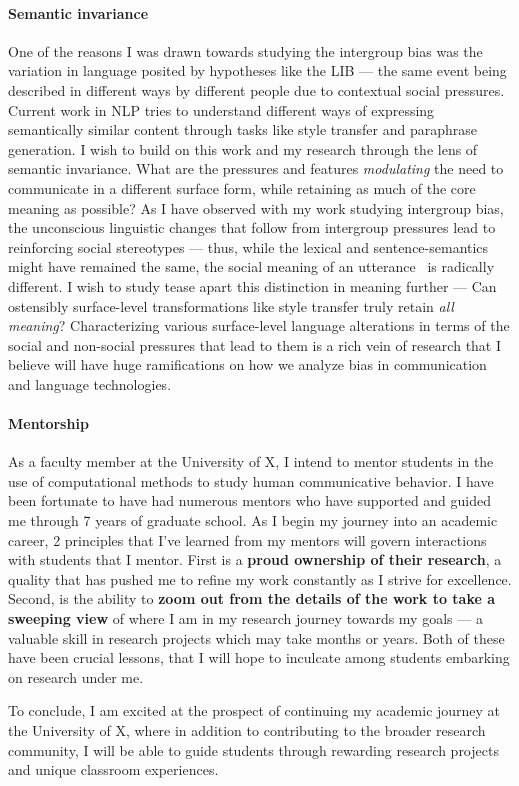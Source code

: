 \documentclass[11pt, letterpaper, biblatex]{practical-report}
\begin{document}
\paragraph{Semantic invariance} One of the reasons I was drawn towards studying the intergroup bias was the variation in language posited by hypotheses like the LIB --- the same event being described in different ways by different people due to contextual social pressures. Current work in NLP tries to understand different ways of expressing semantically similar content through tasks like style transfer and paraphrase generation. I wish to build on this work and my research through the lens of semantic invariance. What are the pressures and features \emph{modulating} the need to communicate in a different surface form, while retaining as much of the core meaning as possible? As I have observed with my work studying intergroup bias, the unconscious linguistic changes that follow from intergroup pressures lead to reinforcing social stereotypes --- thus, while the lexical and sentence-semantics might have remained the same, the social meaning of an utterance~\citep{eckert2005variation} is radically different. I wish to study tease apart this distinction in meaning further --- Can ostensibly surface-level transformations like style transfer truly retain \emph{all meaning}? Characterizing various surface-level language alterations in terms of the social and non-social pressures that lead to them is a rich vein of research that I believe will have huge ramifications on how we analyze bias in communication and language technologies.

\paragraph{Mentorship} As a faculty member at the University of X, I intend to mentor students in the use of computational methods to study human communicative behavior. I have been fortunate to have had numerous mentors who have supported and guided me through 7 years of graduate school. As I begin my journey into an academic career, 2 principles that I've learned from my mentors will govern interactions with students that I mentor. First is a \textbf{proud ownership of their research}, a quality that has pushed me to refine my work constantly as I strive for excellence. Second, is the ability to \textbf{zoom out from the details of the work to take a sweeping view} of where I am in my research journey towards my goals --- a valuable skill in research projects which may take months or years. Both of these have been crucial lessons, that I will hope to inculcate among students embarking on research under me.

To conclude, I am excited at the prospect of continuing my academic journey at the University of X, where in addition to contributing to the broader research community, I will be able to guide students through rewarding research projects and unique classroom experiences.

\printbibliography[title=References]
\end{document}

